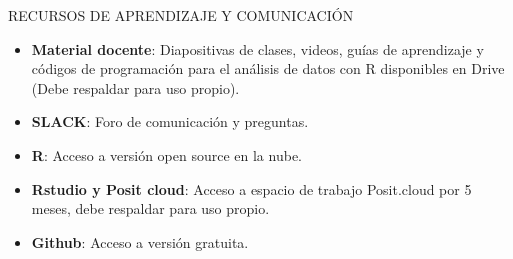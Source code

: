 \documentclass[
  ignorenonframetext,
]{beamer}
\begin{document}
\begin{frame}{RECURSOS DE APRENDIZAJE Y COMUNICACIÓN}
\protect\hypertarget{recursos-de-aprendizaje-y-comunicaciuxf3n}{}

\begin{itemize}
\item
  \textbf{Material docente}: Diapositivas de clases, videos, guías de
  aprendizaje y códigos de programación para el análisis de datos con R
  disponibles en Drive (Debe respaldar para uso propio).
\item
  \textbf{SLACK}: Foro de comunicación y preguntas.
\item
  \textbf{R}: Acceso a versión open source en la nube.
\item
  \textbf{Rstudio y Posit cloud}: Acceso a espacio de trabajo
  Posit.cloud por 5 meses, debe respaldar para uso propio.
\item
  \textbf{Github}: Acceso a versión gratuita.
\end{itemize}

\end{frame}
\end{document}
